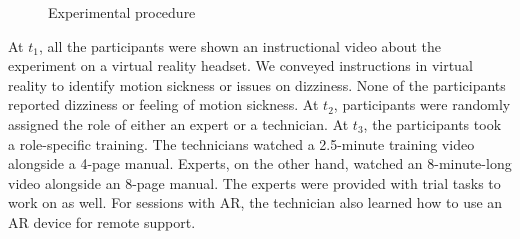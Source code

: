 \documentclass[msom,nonblindrev]{01 latex/class/informs3}
\begin{document}
\begin{figure}[h]
\FIGURE
{
}
{Experimental procedure\label{fig:experimental_procedure}}
{}
\end{figure}

At $t_1$, all the participants were shown an instructional video about the experiment on a virtual reality headset. We conveyed instructions in virtual reality to identify motion sickness or issues on dizziness. None of the participants reported dizziness or feeling of motion sickness. At $t_2$, participants were randomly assigned the role of either an expert or a technician. At $t_3$, the participants took a role-specific training. The technicians watched a 2.5-minute training video alongside a 4-page manual. Experts, on the other hand, watched an 8-minute-long video alongside an 8-page manual. The experts were provided with trial tasks to work on as well. For sessions with AR, the technician also learned how to use an AR device for remote support.  
\end{document}
